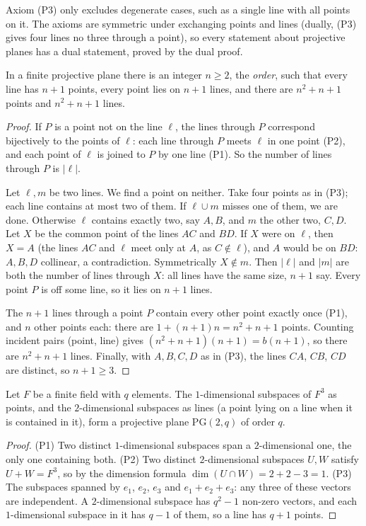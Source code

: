 Axiom (P3) only excludes degenerate cases, such as a single line with all points on it. The axioms are symmetric under exchanging points and lines (dually, (P3) gives four lines
no three through a point), so every statement about projective planes has a dual statement, proved by the dual proof.

\begin{proposition}\label{prop:order}
In a finite projective plane there is an integer $n\ge2$, the \emph{order}, such that every line has $n+1$ points, every point lies on $n+1$ lines, and there are $n^2+n+1$ points and
$n^2+n+1$ lines.
\end{proposition}
\begin{proof}
If $P$ is a point not on the line $\ell$, the lines through $P$ correspond bijectively to the points of $\ell$: each line through $P$ meets $\ell$ in one point (P2), and each point of $\ell$
is joined to $P$ by one line (P1). So the number of lines through $P$ is $|\ell|$.

Let $\ell,m$ be two lines. We find a point on neither. Take four points as in (P3); each line contains at most two of them. If $\ell\cup m$ misses one of them, we are done. Otherwise
$\ell$ contains exactly two, say $A,B$, and $m$ the other two, $C,D$. Let $X$ be the common point of the lines $AC$ and $BD$. If $X$ were on $\ell$, then $X=A$ (the lines $AC$ and $\ell$ meet only
at $A$, as $C\notin\ell$), and $A$ would be on $BD$: $A,B,D$ collinear, a contradiction. Symmetrically $X\notin m$. Then $|\ell|$ and $|m|$ are both the number of lines through $X$: all lines
have the same size, $n+1$ say. Every point $P$ is off some line, so it lies on $n+1$ lines.

The $n+1$ lines through a point $P$ contain every other point exactly once (P1), and $n$ other points each: there are $1+(n+1)n=n^2+n+1$ points. Counting incident pairs (point, line)
gives $(n^2+n+1)(n+1)=b(n+1)$, so there are $n^2+n+1$ lines. Finally, with $A,B,C,D$ as in (P3), the lines $CA$, $CB$, $CD$ are distinct, so $n+1\ge3$.
\end{proof}

\begin{theorem}\label{thm:pg}
Let $F$ be a finite field with $q$ elements. The $1$-dimensional subspaces of $F^3$ as points, and the $2$-dimensional subspaces as lines (a point lying on a line when it is contained in it), form
a projective plane $\mathrm{PG}(2,q)$ of order $q$.
\end{theorem}
\begin{proof}
(P1) Two distinct $1$-dimensional subspaces span a $2$-dimensional one, the only one containing both. (P2) Two distinct $2$-dimensional subspaces $U,W$ satisfy $U+W=F^3$, so by the dimension
formula $\dim(U\cap W)=2+2-3=1$. (P3) The subspaces spanned by $e_1$, $e_2$, $e_3$ and $e_1+e_2+e_3$: any three of these vectors are independent. A $2$-dimensional subspace has $q^2-1$ non-zero vectors,
and each $1$-dimensional subspace in it has $q-1$ of them, so a line has $q+1$ points.
\end{proof}

